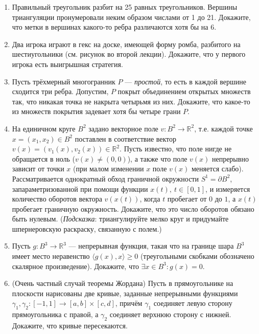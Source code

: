 \documentclass[12pt]{article}
\def\ra{\rightarrow}
\def\RR{\mathbb{R}}
\begin{document}
\begin{enumerate}
  \item Правильный треугольник разбит на 25 равных треугольников. Вершины триангуляции пронумеровали неким образом числами от 1 до 21. Докажите, что метки в вершинах какого-то ребра различаются хотя бы на 6.

  \item Два игрока играют в гекс на доске, имеющей форму ромба, разбитого на шестиугольники (см. рисунок во второй лекции). Докажите, что у первого игрока есть выигрышная стратегия.

  \item Пусть трёхмерный многогранник $P$ --- \emph{простой}, то есть в каждой вершине сходится три ребра. Допустим, $P$ покрыт объединением открытых множеств так, что никакая точка не накрыта четырьмя из них. Докажите, что какое-то из множеств покрытия задевает хотя бы четыре грани $P$.

  \item На единичном круге $B^2$ задано векторное поле $v: B^2 \ra \RR^2$, т.е. каждой точке $x = (x_1,x_2) \in B^2$ поставлен в соответствие вектор $v(x) = (v_1(x), v_2(x)) \in \RR^2$. Пусть известно, что поле нигде не обращается в ноль ($v(x) \neq (0,0)$), а также что поле $v(x)$ непрерывно зависит от точки $x$ (при малом изменении $x$ поле $v(x)$ меняется слабо). Рассматривается однократный обход граничной окружности $S^1 = \partial B^2$, запараметризованной при помощи функции $x(t), \ t\in[0,1]$, и измеряется количество оборотов вектора $v(x(t))$, когда $t$ пробегает от $0$ до $1$, а $x(t)$ пробегает граничную окружность. Докажите, что это число оборотов обязано быть нулевым.
  (\emph{Подсказка}: триангулируйте мелко круг и придумайте шпернеровскую раскраску, связанную с полем.)

  \item Пусть $g : B^3 \ra \RR^3$ --- непрерывная функция, такая что на границе шара $B^3$ имеет место неравенство $\langle g(x),x \rangle \geqslant 0$ (треугольными скобками обозначено скалярное произведение). Докажите, что $\exists x \in B^3 : g(x)=0$.

  \item (Очень частный случай теоремы Жордана) Пусть в прямоугольнике на плоскости нарисованы две кривые, заданные непрерывными функциями $\gamma_1, \gamma_2: [-1,1] \to [a,b]\times [c,d]$, причём $\gamma_1$ соединяет левую сторону прямоугольника с правой, а $\gamma_2$ соединяет верхнюю сторону с нижней. Докажите, что кривые пересекаются.



\end{enumerate}
\end{document}
